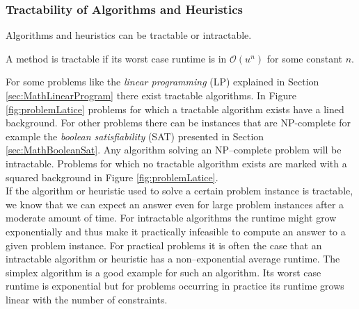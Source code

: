 \subsubsection{Tractability of Algorithms and Heuristics}
Algorithms and heuristics can be tractable or intractable. 
\begin{definition}[tractability]
A method is tractable if its worst case runtime is in $\mathcal{O}(u^n)$ for some constant $n$. 
\end{definition}
For some problems like the \emph{linear programming} (LP) explained in Section \ref{sec:MathLinearProgram} there exist tractable algorithms. In Figure \ref{fig:problemLatice} problems for which a tractable algorithm exists have a lined background. For other problems there can be instances that are NP-complete for example the \emph{boolean satisfiability} (SAT) presented in Section \ref{sec:MathBooleanSat}. Any algorithm solving an NP--complete problem will be intractable. Problems for which no tractable algorithm exists are marked with a squared background in Figure \ref{fig:problemLatice}.\\
If the algorithm or heuristic used to solve a certain problem instance is tractable, we know that we can expect an answer even for large problem instances after a moderate amount of time. For intractable algorithms the runtime might grow exponentially and thus make it practically infeasible to compute an answer to a given problem instance. For practical problems it is often the case that an intractable algorithm or heuristic has a non--exponential average runtime. The simplex algorithm is a good example for such an algorithm. Its worst case runtime is exponential but for problems occurring in practice its runtime grows linear with the number of constraints.
